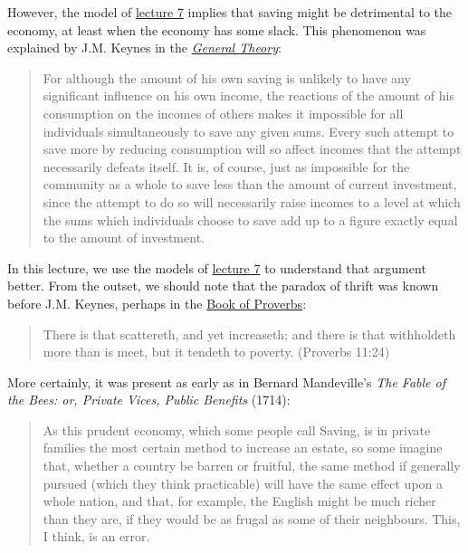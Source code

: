 \documentclass[]{book}
\theoremstyle{definition}
\theoremstyle{definition}
\theoremstyle{definition}
\theoremstyle{remark}
\begin{document}
However, the model of \href{lecture7.html}{lecture 7} implies that
saving might be detrimental to the economy, at least when the economy
has some slack. This phenomenon was explained by J.M. Keynes in the
\href{http://cas2.umkc.edu/economics/people/facultypages/kregel/courses/econ645/winter2011/generaltheory.pdf}{\emph{General
Theory}}:

\begin{quote}
For although the amount of his own saving is unlikely to have any
significant influence on his own income, the reactions of the amount of
his consumption on the incomes of others makes it impossible for all
individuals simultaneously to save any given sums. Every such attempt to
save more by reducing consumption will so affect incomes that the
attempt necessarily defeats itself. It is, of course, just as impossible
for the community as a whole to save less than the amount of current
investment, since the attempt to do so will necessarily raise incomes to
a level at which the sums which individuals choose to save add up to a
figure exactly equal to the amount of investment.
\end{quote}

In this lecture, we use the models of \href{lecture7.html}{lecture 7} to
understand that argument better. From the outset, we should note that
the paradox of thrift was known before J.M. Keynes, perhaps in the
\href{https://en.wikipedia.org/wiki/Book_of_Proverbs}{Book of Proverbs}:

\begin{quote}
There is that scattereth, and yet increaseth; and there is that
withholdeth more than is meet, but it tendeth to poverty. (Proverbs
11:24)
\end{quote}

More certainly, it was present as early as in Bernard Mandeville's
\emph{The Fable of the Bees: or, Private Vices, Public Benefits} (1714):

\begin{quote}
As this prudent economy, which some people call Saving, is in private
families the most certain method to increase an estate, so some imagine
that, whether a country be barren or fruitful, the same method if
generally pursued (which they think practicable) will have the same
effect upon a whole nation, and that, for example, the English might be
much richer than they are, if they would be as frugal as some of their
neighbours. This, I think, is an error.
\end{quote}
\end{document}

